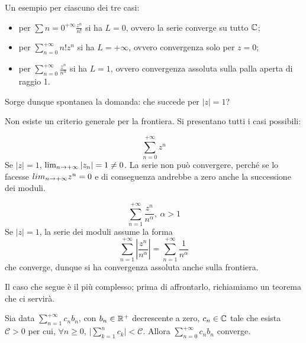 \documentclass[Completo.tex]{subfiles}
\begin{document}
\begin{Ex} Un esempio per ciascuno dei tre casi:
	\begin{itemize}
		\item per $\sum{n=0}^{+\infty} \frac{z^n}{n!}$ si ha $L = 0$, ovvero la serie converge su tutto $\bb[C]$;
		\item per $\sum_{n=0}^{+\infty} n! z^n$ si ha $L = +\infty$, ovvero convergenza solo per $z = 0$;
		\item per $\sum_{n=0}^{+\infty} \frac{z^n}{n^{\alpha}}$ si ha $L = 1$, ovvero convergenza assoluta sulla palla aperta di raggio 1. 
	\end{itemize}
Sorge dunque spontanea la domanda: che succede per $\vert z \vert = 1$?
\end{Ex}
Non esiste un criterio generale per la frontiera. Si presentano tutti i casi possibili:
\begin{Ex}
	\begin{equation*}
	\sum\limits_{n=0}^{+\infty} z^n
	\end{equation*}
Se $\vert z \vert = 1$, $\lim_{n \rightarrow +\infty} \vert z_n \vert = 1 \neq 0$. La serie non può convergere, perché se lo facesse $lim_{n \rightarrow +\infty} z^n = 0$ e di conseguenza andrebbe a zero anche la successione dei moduli.
\end{Ex}
\begin{Ex}
	\begin{equation*}
	\sum\limits_{n=1}^{+\infty} \frac{z^n}{n^{\alpha}}, \ \alpha > 1
	\end{equation*}
	Se $\vert z \vert = 1$, la serie dei moduli assume la forma
	\begin{equation*}
		\sum\limits_{n=1}^{+\infty} \left\vert \frac{z^n}{n^{\alpha}} \right\vert = 	\sum\limits_{n=1}^{+\infty} \frac{1}{n^{\alpha}}
	\end{equation*}
	che converge, dunque si ha convergenza assoluta anche sulla frontiera.
\end{Ex}
Il caso che segue è il più complesso; prima di affrontarlo, richiamiamo un teorema che ci servirà.
\begin{Th}
	Sia data $\sum_{n=1}^{+\infty} c_n b_n$, con $b_n \in \bb[R]^+$ decrescente a zero, $c_n \in \bb[C]$ tale che esista $\mathcal{C} > 0$ per cui, $\forall n \geq 0$, $\vert\sum_{k = 1}^{n}  c_k\vert  < \mathcal{C}$. Allora $\sum_{n=0}^{+\infty} c_n b_n$ converge.\end{Th}
\end{document}

